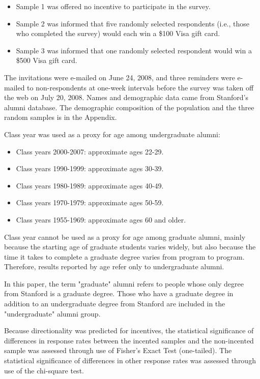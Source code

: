 \documentclass[12pt]{article}
\begin{document}
\begin{itemize}
    \item Sample 1 was offered no incentive to participate in the survey.
    \item Sample 2 was informed that five randomly selected respondents (i.e., those who completed the survey) would each win a \$100 Visa gift card.
    \item Sample 3 was informed that one randomly selected respondent would win a \$500 Visa gift card.
\end{itemize}

The invitations were e-mailed on June 24, 2008, and three reminders were e-mailed to non-respondents at one-week intervals before the survey was taken off the web on July 20, 2008.  
Names and demographic data came from Stanford's alumni database.  The demographic composition of the population and the three random samples is in the Appendix. 

Class year was used as a proxy for age among undergraduate alumni:
\begin{itemize}
    \item Class years 2000-2007: approximate ages 22-29.
    \item Class years 1990-1999: approximate ages 30-39.
    \item Class years 1980-1989: approximate ages 40-49.
    \item Class years 1970-1979: approximate ages 50-59.
    \item Class years 1955-1969: approximate ages 60 and older.
\end{itemize}

Class year cannot be used as a proxy for age among graduate alumni, mainly because the starting age of graduate students varies widely, but also because the time it takes to complete a graduate degree varies from program to program.  Therefore, results reported by age refer only to undergraduate alumni.

In this paper, the term "graduate" alumni refers to people whose only degree from Stanford is a graduate degree.  Those who have a graduate degree in addition to an undergraduate degree from Stanford are included in the "undergraduate" alumni group.

Because directionality was predicted for incentives, the statistical significance of differences in response rates between the incented samples and the non-incented sample was assessed through use of Fisher's Exact Test (one-tailed).  The statistical significance of differences in other response rates was assessed through use of the chi-square test.
\end{document}
